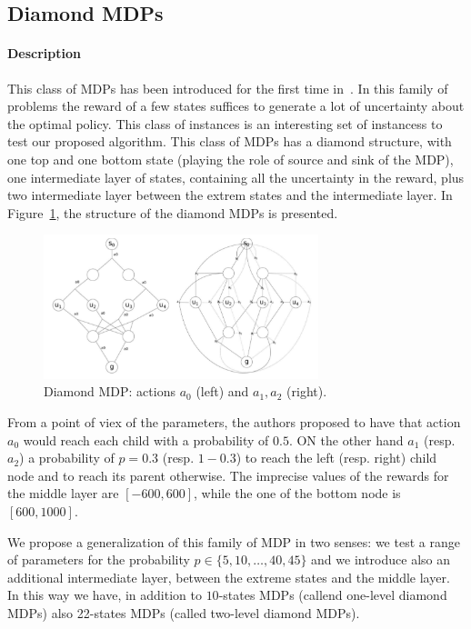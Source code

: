 \subsection{Diamond MDPs}
\paragraph{Description}
This class of MDPs has been introduced for the first time in~\cite{benavent2018}. 
In this family of problems the reward of a few states suffices to generate a lot of uncertainty about the optimal policy. This class of instances is an interesting set of instancess to test our proposed algorithm.
This class of MDPs has a diamond structure, with one top and one bottom state (playing the role of source and sink of the  MDP), one intermediate layer of states, containing all the uncertainty in the reward, plus two intermediate layer between the extrem states and the intermediate layer.
In Figure~\ref{fig:diamond}, the structure of the diamond MDPs is presented.

\begin{figure}[h]
\begin{center}
\includegraphics[width=8cm]{diamond.png}
\end{center}
\caption{Diamond MDP: actions $a_0$ (left) and $a_1, a_2$ (right).}
\label{fig:diamond}
\end{figure}

From a point of viex of the parameters, the authors proposed to have that action $a_0$ would reach each child with a probability of $0.5$. ON the other hand $a_1$ (resp. $a_2$) a probability of $p= 0.3$ (resp. $1-0.3$) to reach the left (resp. right) child node and to reach its parent otherwise.
The imprecise values of the rewards for the middle layer are $[-600,600]$, while the one of the bottom node is $[600,1000]$.

We propose a generalization of this family of MDP in two senses: we test a range of parameters for the probability $p \in \{5,10,\dots,40,45\}$ and we introduce also an additional intermediate layer, between the extreme states and the middle layer. In this way we have, in addition to $10$-states MDPs (callend one-level diamond MDPs) also  22-states MDPs (called two-level diamond MDPs). 

